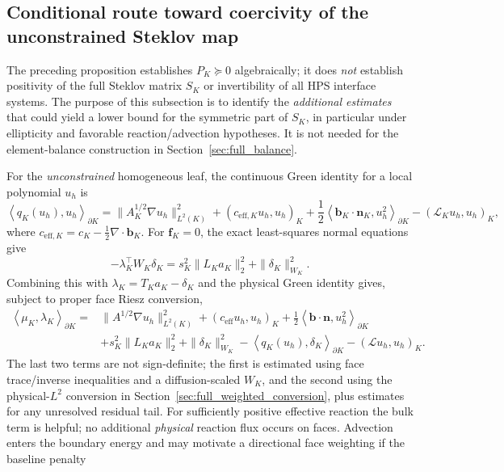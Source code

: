 \documentclass[11pt]{article}
\newcommand{\dual}[2]{\left\langle #1,#2\right\rangle}
\begin{document}
\subsection{Conditional route toward coercivity of the unconstrained Steklov map}
The preceding proposition establishes $P_K\succeq0$ algebraically;
it does \emph{not} establish positivity of the full Steklov matrix
$S_K$ or invertibility of all HPS interface systems.  The purpose of
this subsection is to identify the \emph{additional estimates} that
could yield a lower bound for the symmetric part of $S_K$, in
particular under ellipticity and favorable reaction/advection
hypotheses.  It is not needed for the element-balance construction in
Section~\ref{sec:full_balance}.

For the \emph{unconstrained} homogeneous leaf, the continuous Green
identity for a local polynomial $u_h$ is
\begin{equation}\label{eq:full_green_energy}
 \dual{q_K(u_h)}{u_h}_{\partial K}
 =\|A_K^{1/2}\nabla u_h\|_{L^2(K)}^2
 +(c_{\mathrm{eff},K}u_h,u_h)_K
 +\frac12\dual{\bm b_K\cdot\bm n_K}{u_h^2}_{\partial K}
 -(\mathcal L_Ku_h,u_h)_K,
\end{equation}
where $c_{\mathrm{eff},K}=c_K-\frac12\nabla\cdot\bm b_K$.
For $\bm f_K=0$, the exact least-squares normal equations give
\begin{equation}\label{eq:full_normal_energy}
 -\lambda_K^\top W_K\delta_K
 =s_K^2\|L_Ka_K\|_2^2+\|\delta_K\|_{W_K}^2.
\end{equation}
Combining this with $\lambda_K=T_Ka_K-\delta_K$ and the physical
Green identity gives, subject to proper face Riesz conversion,
\begin{align}\label{eq:full_energy_route}
 \dual{\mu_K}{\lambda_K}_{\partial K}
 ={}&\|A^{1/2}\nabla u_h\|_{L^2(K)}^2
 +(c_{\mathrm{eff}}u_h,u_h)_K
 +\tfrac12\dual{\bm b\cdot\bm n}{u_h^2}_{\partial K}
 \nonumber\\
 &+s_K^2\|L_Ka_K\|_2^2+\|\delta_K\|_{W_K}^2
 -\dual{q_K(u_h)}{\delta_K}_{\partial K}
 -(\mathcal Lu_h,u_h)_K.
\end{align}
The last two terms are not sign-definite; the first is estimated using
face trace/inverse inequalities and a diffusion-scaled $W_K$, and the
second using the physical-$L^2$ conversion in
Section~\ref{sec:full_weighted_conversion}, plus estimates for any
unresolved residual tail.  For sufficiently positive effective
reaction the bulk term is helpful; no additional \emph{physical}
reaction flux occurs on faces.  Advection enters the boundary energy
and may motivate a directional face weighting if the baseline penalty
\end{document}
